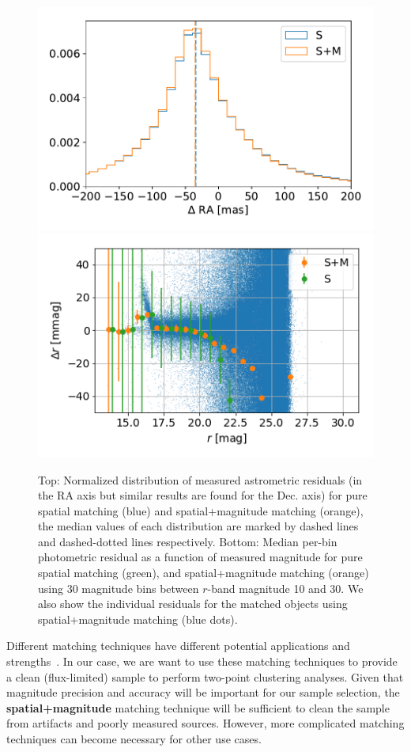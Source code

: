 \documentclass[twocolumn]{aastex62}
\begin{document}
\begin{figure}
\centering
\includegraphics[width=0.9\columnwidth]{astrometry_residual_comparison}
\includegraphics[width=0.9\columnwidth]{photometry_residual_comparison}
\caption{Top: Normalized distribution of measured astrometric residuals (in the RA axis but similar results are found for the Dec. axis) for pure spatial matching (blue) and spatial+magnitude matching (orange), the median values of each distribution are marked by dashed lines and dashed-dotted lines respectively. Bottom: Median per-bin photometric residual as a function of measured magnitude for pure spatial matching (green), and spatial+magnitude matching (orange) using 30 magnitude bins between $r$-band magnitude 10 and 30. We also show the individual residuals for the matched objects using spatial+magnitude matching (blue dots).}
\label{fig:matching_comparison}
\end{figure}

Different matching techniques have different potential applications and strengths~\citet{doi:10.1146/annurev-statistics-010814-020231}. In our case, we are want to use these matching techniques to provide a clean (flux-limited) sample to perform two-point clustering analyses. Given that magnitude precision and accuracy will be important for our sample selection, the \textbf{spatial+magnitude} matching technique will be sufficient to clean the sample from artifacts and poorly measured sources. However, more complicated matching techniques can become necessary for other use cases.
  
\end{document}
